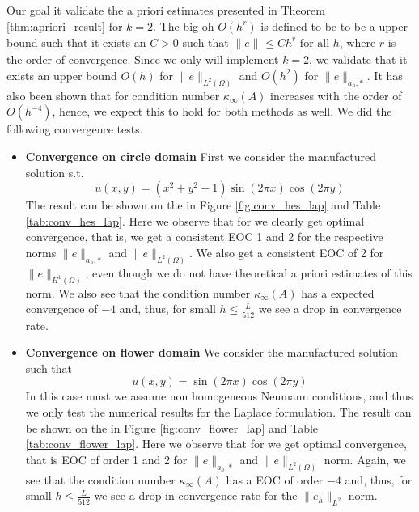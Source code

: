 \documentclass[11pt]{article}
\theoremstyle{remark}
\renewcommand{\le}{\leqslant}
\numberwithin{equation}{section}
\begin{document}
Our goal it validate the a priori estimates presented in Theorem \ref{thm:apriori_result} for $k= 2$.
The big-oh $O( h^{r})$ is defined to be to be a upper bound such that it exists an $C>0$ such that $\| e \|_{  }^{  } \le C h^{r} \text{ for all } h$, where $r$ is the order of convergence. Since we only will implement $k=2$, we validate that it exists an upper bound $ O( h)  $ for  $\| e \|_{L^{2}( \Omega )   }^{  }$  and $O( h^2)  $ for $\| e \|_{ a_{h},* }^{  } $.
It has also been shown that for condition number $\kappa_{\infty} ( A) $  increases with the order of $O( h^{-4}) $\cite{li07}, hence, we expect this to hold for both methods as well.
We did the following convergence tests.
\begin{itemize}
    \item \textbf{Convergence on circle domain}
        First we consider the manufactured solution s.t.
        \begin{equation}
        \label{eq:man_sol_1}
            u(x,y) = (x^2+ y^2 -1) \sin\left(2 \pi x \right)\cos\left(2\pi y\right)
        \end{equation}
        The result can be shown on the in Figure \ref{fig:conv_hes_lap} and Table \ref{tab:conv_hes_lap}. Here we observe that for we clearly get optimal convergence, that is, we get a consistent EOC 1 and 2 for the respective norms $\| e  \|_{a_{h},*  }^{  } $
        and $\| e  \|_{L^2( \Omega )   }^{  } $.  We also get a consistent EOC of 2 for $\| e \|_{ H^{1}(\Omega  )  }^{  } $, even though we do not have theoretical a priori estimates of this norm.
        We also see that the condition number $\kappa _{\infty}( A)  $ has a expected
        convergence of $-4$ and, thus, for small $h\le \frac{L}{512}$ we see a drop in convergence rate.
    \item \textbf{Convergence on flower domain}
        We consider the manufactured solution such that
        \begin{equation}
        \label{eq:man_sol_2}
            u(x,y) =  \sin\left( 2\pi x \right)\cos\left(2\pi y\right)
        \end{equation}
        In this case must we assume non homogeneous Neumann conditions, and thus we only test the numerical results for the Laplace formulation. The result can be shown on the in Figure \ref{fig:conv_flower_lap} and Table \ref{tab:conv_flower_lap}. Here we
        observe that for we get optimal convergence, that is EOC of order 1 and 2 for $\| e  \|_{a_{h},*  }^{  } $ and  $ \| e  \|_{L^{2}( \Omega )   }^{  } $ norm. Again, we see that the condition number $\kappa _{\infty}( A)  $ has a EOC of order
        $-4$ and, thus, for small $h\le \frac{L}{512}$ we see a drop in convergence rate for the $\| e_{h} \|_{ L^{2} }^{  } $ norm.
\end{itemize}
\end{document}
